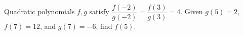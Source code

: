 Quadratic polynomials $f,g$ satisfy $\dfrac{f(-2)}{g(-2)}=\dfrac{f(3)}{g(3)}=4$. Given $g(5)=2$, $f(7)=12$, and $g(7)=-6$, find $f(5)$.
